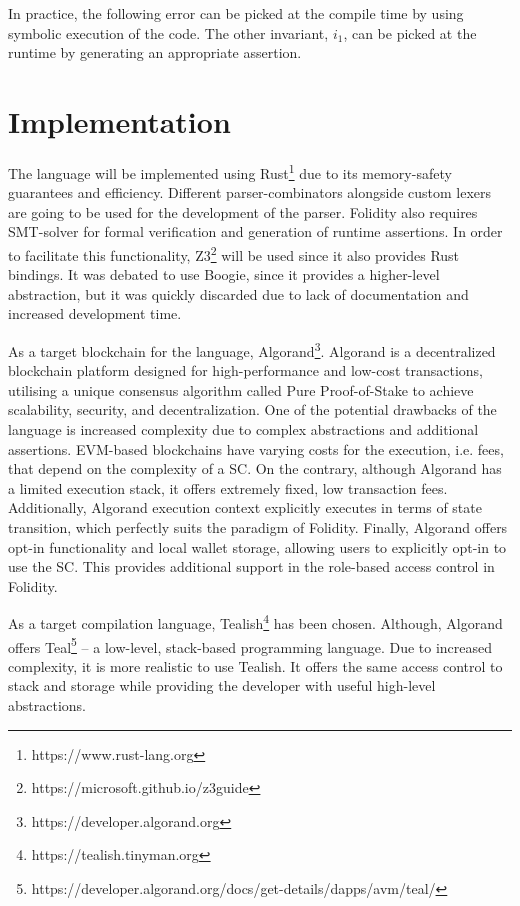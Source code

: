 \documentclass[oneside]{ecsproject}     %
\begin{document}
In practice, the following error can be picked at the compile time by using symbolic execution of the code.
The other invariant, $i_1$, can be picked at the runtime by generating an appropriate assertion.

\section{Implementation}

The language will be implemented using Rust\footnote{https://www.rust-lang.org} due to its memory-safety guarantees and efficiency. 
Different parser-combinators alongside custom lexers are going to be used for the development of the parser. 
Folidity also requires SMT-solver for formal verification and generation of runtime assertions. In order to facilitate this functionality,
Z3\footnote{https://microsoft.github.io/z3guide} will be used since it also provides Rust bindings. It was debated to use Boogie, since it provides
a higher-level abstraction, but it was quickly discarded due to lack of documentation and increased development time.

As a target blockchain for the language, Algorand\footnote{https://developer.algorand.org}. 
Algorand is a decentralized blockchain platform designed for high-performance and low-cost transactions, 
utilising a unique consensus algorithm called Pure Proof-of-Stake to achieve scalability, security, and decentralization\cite{algorand}.
One of the potential drawbacks of the language is
increased complexity due to complex abstractions and additional assertions. EVM-based blockchains have varying costs for the execution, i.e. fees,
that depend on the complexity of a SC. On the contrary, although Algorand has a limited execution stack, it offers extremely fixed, low transaction fees.
Additionally, Algorand execution context explicitly executes in terms of state transition, which perfectly suits the paradigm of Folidity.
Finally, Algorand offers opt-in functionality and local wallet storage, allowing users to explicitly opt-in to use the SC.
This provides additional support in the role-based access control in Folidity.

As a target compilation language, Tealish\footnote{https://tealish.tinyman.org} has been chosen.
Although, Algorand offers Teal\footnote{https://developer.algorand.org/docs/get-details/dapps/avm/teal/} –
a low-level, stack-based programming language. Due to increased complexity, it is more realistic to use Tealish.
It offers the same access control to stack and storage while providing the developer with useful high-level abstractions.
\end{document}
